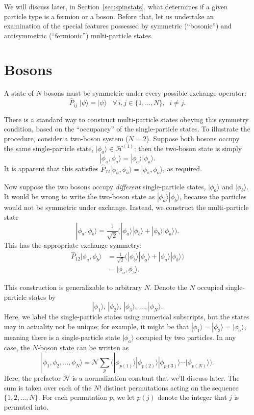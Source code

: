 \documentclass[pra,11pt]{revtex4}
\begin{document}
We will discuss later, in Section~\ref{sec:spinstats}, what determines
if a given particle type is a fermion or a boson.  Before that, let us
undertake an examination of the special features possessed by
symmetric (``bosonic'') and antisymmetric (``fermionic'')
multi-particle states.

\section{Bosons}

A state of $N$ bosons must be symmetric under every possible exchange
operator:
$$\hat{P}_{ij}\; |\psi\rangle = |\psi\rangle \;\;\; \forall\, i, j \in\{1,\dots,N\},\;\; i\ne j.$$

There is a standard way to construct multi-particle states obeying
this symmetry condition, based on the ``occupancy'' of the
single-particle states.  To illustrate the procedure, consider a
two-boson system ($N = 2$).  Suppose both bosons occupy the same
single-particle state, $|\phi_a\rangle \in \mathscr{H}^{(1)}$; then
the two-boson state is simply
$$|\phi_a,\phi_a\rangle = |\phi_a\rangle  |\phi_a\rangle.$$
It is apparent that this satisfies $\hat{P}_{12}
|\phi_a,\phi_a\rangle = |\phi_a,\phi_a\rangle$, as required.

Now suppose the two bosons occupy \textit{different} single-particle
states, $|\phi_a\rangle$ and $|\phi_b\rangle$.  It would be wrong to
write the two-boson state as $|\phi_a\rangle |\phi_b\rangle$, because
the particles would not be symmetric under exchange.  Instead, we
construct the multi-particle state
$$|\phi_a,\phi_b\rangle = \frac{1}{\sqrt{2}} \Big( |\phi_a\rangle  |\phi_b\rangle + |\phi_b\rangle  |\phi_a\rangle\Big).$$
This has the appropriate exchange symmetry:
$$\begin{aligned}\hat{P}_{12}|\phi_a,\phi_b\rangle &= \frac{1}{\sqrt{2}} \Big( |\phi_b\rangle  |\phi_a\rangle + |\phi_a\rangle  |\phi_b\rangle\Big) \\ &= |\phi_a,\phi_b\rangle.\end{aligned}$$

This construction is generalizable to arbitrary $N$.  Denote the $N$
occupied single-particle states by
$$|\phi_1\rangle, \, |\phi_2\rangle, \, |\phi_3\rangle, \, \dots, |\phi_N\rangle.$$
Here, we label the single-particle states using numerical subscripts,
but the states may in actuality not be unique; for example, it might
be that $|\phi_1\rangle = |\phi_2\rangle = |\phi_a\rangle$, meaning
there is a single-particle state $|\phi_a\rangle$ occupied by two
particles.  In any case, the $N$-boson state can be written as
$$|\phi_1,\phi_2,\dots,\phi_N\rangle = \mathcal{N} \sum_p \Big(|\phi_{p(1)}\rangle  |\phi_{p(2)}\rangle  |\phi_{p(3)}\rangle  \cdots  |\phi_{p(N)}\rangle\Big).$$
Here, the prefactor $\mathcal{N}$ is a normalization constant that
we'll discuss later.  The sum is taken over each of the $N!$ distinct
permutations acting on the sequence $\{1,2,\dots,N\}$.  For each
permutation $p$, we let $p(j)$ denote the integer that $j$ is permuted
into.
\end{document}
